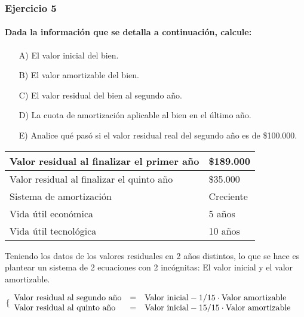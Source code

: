 \documentclass[12pt,a4paper]{article}
\newcommand{\consigna}[1]{\paragraph{\indent #1} \hspace{0pt}}
\begin{document}
        
        \newpage
    
    	\subsubsection{Ejercicio 5}
        
        \consigna{Dada la información que se detalla a continuación, calcule:}
        
        \begin{itemize}
			\item[A)]	El valor inicial del bien.
            \item[B)]	El valor amortizable del bien.
            \item[C)]	El valor residual del bien al segundo año.
            \item[D)]	La cuota de amortización aplicable al bien en el último año.
            \item[E)]	Analice qué pasó si el valor residual real del segundo año es de \$100.000.
		\end{itemize}
        
        \begin{table}[H]
        \centering
        	\begin{tabular}{ | l | l | }
            	\hline
                Valor residual al finalizar el primer año	&	\$189.000	\\ \hline
                Valor residual al finalizar el quinto año	&	\$35.000	\\ \hline
                Sistema de amortización						&	Creciente	\\ \hline
                Vida útil económica							&	5 años		\\ \hline
                Vida útil tecnológica						&	10 años		\\ \hline
			\end{tabular}
		\end{table}
        
        \par{\hspace{0.5cm}
        	Teniendo los datos de los valores residuales en 2 años distintos, lo que se hace es plantear un sistema de 2 ecuaciones con 2 incógnitas: El valor inicial y el valor amortizable.
            }
		
        \begin{center}
        $
        \lbrace
		\begin{array}{ l c l }
            \text{Valor residual al segundo año} &=& \text{Valor inicial} - \text{1/15} \cdot \text{Valor amortizable} \\
            \text{Valor residual al quinto año} &=& \text{Valor inicial} - \text{15/15} \cdot \text{Valor amortizable}
		\end{array}
        $
        \end{center}
        
\end{document}
